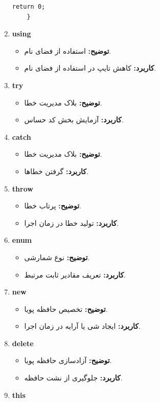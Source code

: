 \documentclass[12pt, a4paper]{report}
\begin{document}
\begin{enumerate}
\begin{lstlisting}[breaklines=true]
		return 0;
	}
		\end{lstlisting}
	\RTL
	\item \textbf{using}
	\begin{itemize}
		\item \textbf{توضیح:} استفاده از فضای نام.
		\item \textbf{کاربرد:} کاهش تایپ در استفاده از فضای نام.
	\end{itemize}
	\item \textbf{try}
	\begin{itemize}
		\item \textbf{توضیح:} بلاک مدیریت خطا.
		\item \textbf{کاربرد:} آزمایش بخش کد حساس.
	\end{itemize}
	\item \textbf{catch}
	\begin{itemize}
		\item \textbf{توضیح:} بلاک مدیریت خطا.
		\item \textbf{کاربرد:} گرفتن خطاها.
	\end{itemize}
	\item \textbf{throw}
	\begin{itemize}
		\item \textbf{توضیح:} پرتاب خطا.
		\item \textbf{کاربرد:} تولید خطا در زمان اجرا.
	\end{itemize}
	\item \textbf{enum}
	\begin{itemize}
		\item \textbf{توضیح:} نوع شمارشی.
		\item \textbf{کاربرد:} تعریف مقادیر ثابت مرتبط.
	\end{itemize}
	\item \textbf{new}
	\begin{itemize}
		\item \textbf{توضیح:} تخصیص حافظه پویا.
		\item \textbf{کاربرد:} ایجاد شی یا آرایه در زمان اجرا.
	\end{itemize}
	\item \textbf{delete}
	\begin{itemize}
		\item \textbf{توضیح:} آزادسازی حافظه پویا.
		\item \textbf{کاربرد:} جلوگیری از نشت حافظه.
	\end{itemize}
	\item \textbf{this}
	\begin{itemize}

\end{itemize}
\end{enumerate}
\end{document}
